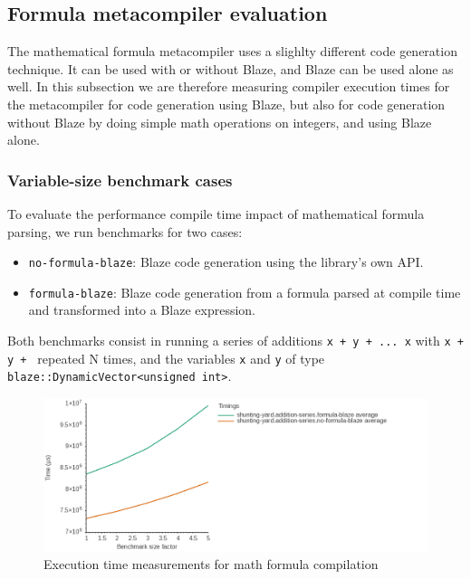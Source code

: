 \documentclass[../../main.tex]{subfiles}
\begin{document}
\subsection{Formula metacompiler evaluation}

The mathematical formula metacompiler uses a slighlty different code generation
technique. It can be used with or without Blaze, and Blaze can be used alone as
well. In this subsection we are therefore measuring compiler execution times for
the metacompiler for code generation using Blaze, but also for code generation
without Blaze by doing simple math operations on integers, and using Blaze
alone.

\subsubsection{Variable-size benchmark cases}

To evaluate the performance compile time impact of mathematical formula parsing,
we run benchmarks for two cases:

\begin{itemize}
\item \lstinline|no-formula-blaze|: Blaze code generation using the library's
      own API.
\item \lstinline|formula-blaze|: Blaze code generation from a formula parsed at
      compile time and transformed into a Blaze expression.
\end{itemize}

Both benchmarks consist in running a series of additions
\lstinline|x + y + ... x| with \lstinline|x + y + | repeated N times, and the
variables \lstinline|x| and \lstinline|y| of type
\lstinline|blaze::DynamicVector<unsigned int>|.

\begin{figure}[h]
\includegraphics[scale=0.5]{
  images/shunting-yard.addition-series.graph.png
}
\caption{Execution time measurements for math formula compilation
}\label{fig:sy-rubbish-benchmark-graph}
\end{figure}
\end{document}

